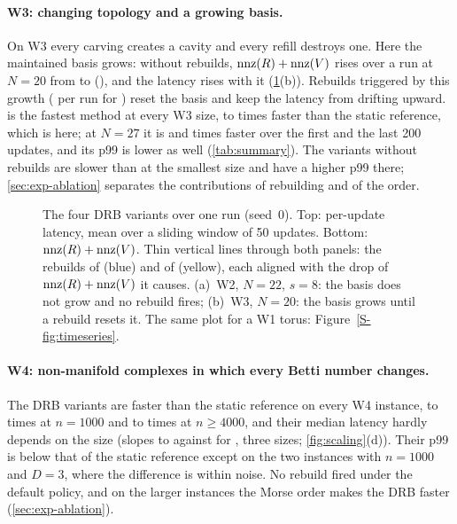 \paragraph{W3: changing topology and a growing basis.}
On W3 every carving creates a cavity and every refill destroys one. Here the
maintained basis grows: without rebuilds, $\operatorname{nnz}(R)+\operatorname{nnz}(V)$ rises over a run at
$N=20$ from \NumWThreeNTwentyDrbIdNnzStart{} to \NumWThreeNTwentyDrbIdNnzEnd{}
(), and the latency rises with it (\cref{fig:mechanism}(b)).
Rebuilds triggered by this growth (\NumWThreeNTwentyMmhmRebuilds{} per run for
) reset the basis and keep the latency from drifting upward.
 is the fastest method at every W3 size,
\NumMainWThreeMmhmSpeedupMin{} to \NumMainWThreeMmhmSpeedupMax{} times faster
than the static reference, which is  here; at $N=27$ it is
\NumWThreeNTwentySevenMmhmSpeedupFullSortedFirstBlock{} and
\NumWThreeNTwentySevenMmhmSpeedupFullSortedLastBlock{} times faster over the
first and the last 200 updates, and its p99 is lower as well (\cref{tab:summary}).
The variants without rebuilds are slower than  at the
smallest size and have a higher p99 there; \cref{sec:exp-ablation} separates the
contributions of rebuilding and of the order.

\begin{figure}[t]
  \centering
  \caption{The four DRB variants over one run (seed~0). Top: per-update latency,
    mean over a sliding window of 50 updates. Bottom: $\operatorname{nnz}(R)+\operatorname{nnz}(V)$. Thin
    vertical lines through both panels: the rebuilds of  (blue)
    and of  (yellow), each aligned with the drop of
    $\operatorname{nnz}(R)+\operatorname{nnz}(V)$ it causes.
    (a)~W2, $N=22$, $s=8$: the basis does not grow and no rebuild fires;
    (b)~W3, $N=20$: the basis grows until a rebuild resets it. The same plot for
    a W1 torus: Figure~\ref{S-fig:timeseries}.}
  \label{fig:mechanism}
\end{figure}

\paragraph{W4: non-manifold complexes in which every Betti number changes.}
The DRB variants are faster than the static reference on every W4 instance,
\NumMainWFourSmallSpeedupMin{} to \NumMainWFourSmallSpeedupMax{} times at
$n=1000$ and \NumMainWFourLargeSpeedupMin{} to \NumMainWFourLargeSpeedupMax{}
times at $n\ge4000$, and their median latency hardly depends on the size
(slopes \NumSlopeEFourWFourPlaneDTwoMmhmNorbMed{} to
\NumSlopeEFourWFourPlaneDTwoDrbIdRbMed{} against
\NumSlopeEFourWFourPlaneDTwoFullIdMed{} for , three sizes;
\cref{fig:scaling}(d)). Their p99 is below that of the static reference except
on the two instances with $n=1000$ and $D=3$, where the difference is within
noise. No rebuild fired under the default policy, and on the larger instances
the Morse order makes the DRB faster (\cref{sec:exp-ablation}).

